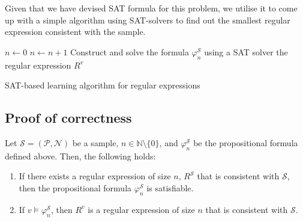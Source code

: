 Given that we have devised SAT formula for this problem, we utilise it to come up with a simple algorithm using SAT-solvers to find out the smallest regular expression consistent with the sample.
\begin{algorithm}
	\DontPrintSemicolon

	\BlankLine
	$n \gets 0$\;
	{
		$n \gets n+1$\;
		Construct and solve the formula $\varphi_n^\mathcal S$ using a SAT solver
	}
	\BlankLine
	\Return the regular expression $R^v$\;

	\caption{SAT-based learning algorithm for regular expressions} \label{alg:sat-learner}
\end{algorithm}

\subsection{Proof of correctness}
\begin{claim}
Let $\mathcal{S} = (\mathcal{P}, \mathcal{N})$ be a sample, $n \in \mathbb N \setminus \{ 0 \}$, and $\varphi_n^\mathcal S$ be the propositional formula defined above.
Then, the following holds:
\begin{enumerate}
	\item If there exists a regular expression of size $n$, $R^{\mathcal S}$ that is consistent with $\mathcal S$, then the propositional formula $\varphi_n^\mathcal S$ is satisfiable.
	\item If $v \models \varphi_n^\mathcal S$, then $R^{v}$ is a regular expression of size $n$ that is consistent with $\mathcal S$.
\end{enumerate}
\end{claim}
